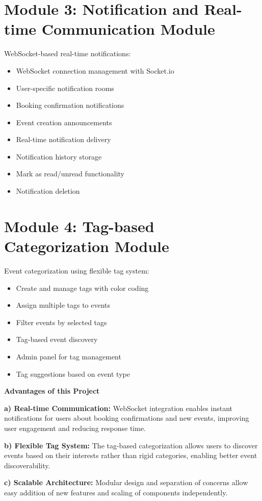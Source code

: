 \documentclass[12pt]{report}
\begin{document}
\section{Module 3: Notification and Real-time Communication Module} 
WebSocket-based real-time notifications:
\begin{itemize}
\item WebSocket connection management with Socket.io
\item User-specific notification rooms
\item Booking confirmation notifications
\item Event creation announcements
\item Real-time notification delivery
\item Notification history storage
\item Mark as read/unread functionality
\item Notification deletion
\end{itemize}

\section{Module 4: Tag-based Categorization Module}
Event categorization using flexible tag system:
\begin{itemize}
\item Create and manage tags with color coding
\item Assign multiple tags to events
\item Filter events by selected tags
\item Tag-based event discovery
\item Admin panel for tag management
\item Tag suggestions based on event type
\end{itemize}

\textbf{Advantages of this Project} 

\textbf{a) Real-time Communication:} 
WebSocket integration enables instant notifications for users about booking confirmations and new events, improving user engagement and reducing response time.

\textbf{b) Flexible Tag System:} 
The tag-based categorization allows users to discover events based on their interests rather than rigid categories, enabling better event discoverability.

\textbf{c) Scalable Architecture:} 
Modular design and separation of concerns allow easy addition of new features and scaling of components independently.
\end{document}
